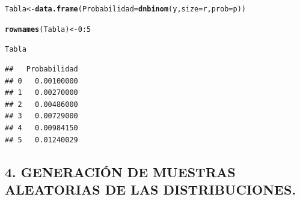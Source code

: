 \documentclass[12pt,letterpaper]{article}\usepackage[]{graphicx}\usepackage[]{color}
\makeatletter
\newcommand{\hlnum}[1]{\textcolor[rgb]{0.686,0.059,0.569}{#1}}%
\newcommand{\hlopt}[1]{\textcolor[rgb]{0,0,0}{#1}}%
\newcommand{\hlstd}[1]{\textcolor[rgb]{0.345,0.345,0.345}{#1}}%
\newcommand{\hlkwb}[1]{\textcolor[rgb]{0.69,0.353,0.396}{#1}}%
\newcommand{\hlkwc}[1]{\textcolor[rgb]{0.333,0.667,0.333}{#1}}%
\newcommand{\hlkwd}[1]{\textcolor[rgb]{0.737,0.353,0.396}{\textbf{#1}}}%
\newenvironment{kframe}{%
 \def\at@end@of@kframe{}%
 \ifinner\ifhmode%
  \def\at@end@of@kframe{\end{minipage}}%
  \begin{minipage}{\columnwidth}%
 \fi\fi%
 \def\FrameCommand##1{\hskip\@totalleftmargin \hskip-\fboxsep
 \colorbox{shadecolor}{##1}\hskip-\fboxsep
     \hskip-\linewidth \hskip-\@totalleftmargin \hskip\columnwidth}%
 \MakeFramed {\advance\hsize-\width
   \@totalleftmargin\z@ \linewidth\hsize
   \@setminipage}}%
 {\par\unskip\endMakeFramed%
 \at@end@of@kframe}
\newenvironment{knitrout}{}{} %
\makeatother
\begin{document}
\begin{itemize}
\begin{knitrout}
\begin{kframe}
\begin{alltt}
\hlstd{Tabla} \hlkwb{<-} \hlkwd{data.frame}\hlstd{(}\hlkwc{Probabilidad}\hlstd{=}\hlkwd{dnbinom}\hlstd{(y,} \hlkwc{size}\hlstd{=r,} \hlkwc{prob}\hlstd{=p))}

\hlkwd{rownames}\hlstd{(Tabla)} \hlkwb{<-} \hlnum{0}\hlopt{:}\hlnum{5}

\hlstd{Tabla}
\end{alltt}
\begin{verbatim}
##   Probabilidad
## 0   0.00100000
## 1   0.00270000
## 2   0.00486000
## 3   0.00729000
## 4   0.00984150
## 5   0.01240029
\end{verbatim}
\end{kframe}
\end{knitrout}
\end{itemize}

\newpage
\begin{center}
\subsection*{4. GENERACI\'ON DE MUESTRAS ALEATORIAS DE LAS DISTRIBUCIONES.}
\end{center}
\end{document}
